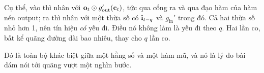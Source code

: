 Cụ thể, vào thì nhân với \(\mathbf{o}_t \odot g_{\mathrm{out}}'(\mathbf{c}_t)\),
tức qua cổng ra và qua đạo hàm của hàm nén output; ra thì nhân với một thừa số
có \(\mathbf{i}_{t-q}\) và \(g_{\mathrm{in}}'\) trong đó. Cả hai thừa số nhỏ hơn
1, nên tín hiệu \emph{có} yếu đi. Điều nó không làm là yếu đi theo \(q\). Hai
lần co, bất kể quãng đường dài bao nhiêu, thay cho \(q\) lần co.

Đó là toàn bộ khác biệt giữa một hằng số và một hàm mũ, và nó là lý do bài dám
nói tới quãng vượt một nghìn bước.
